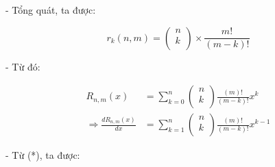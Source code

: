 \documentclass[12pt]{article}
\begin{document}
\begin{sloppypar}
- Tổng quát, ta được:

\begin{equation*}
    r_{k}(n,m) = \begin{pmatrix} n \\ k \\ \end{pmatrix} \times \frac{m!}{(m-k)!}
\end{equation*}

- Từ đó:



\begin{align*}
    R_{n,m}(x) & = \sum_{k = 0}^{n} \begin{pmatrix} n \\ k \\ \end{pmatrix}\frac{(m)!}{(m-k)!}x^{k} \\
    \Rightarrow \frac{dR_{n,m}(x)}{dx} & = \sum_{k = 1}^{n} \begin{pmatrix} n \\ k \\ \end{pmatrix}\frac{(m)!}{(m-k)!}x^{k-1}
\end{align*}

- Từ (*), ta được:


\end{sloppypar}
\end{document}
